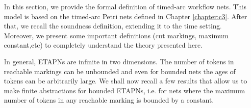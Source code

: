 %
%
%



In this section, we provide the formal definition of timed-arc workflow nets. This model is based on the 
timed-arc Petri nets defined in Chapter \ref{chapter:c3}. After that, we recall the soundness definition, extending it
to the time setting. Moreover, we present some important definitions (cut markings, maximum constant,etc) 
to completely understand the theory presented here.

In general, ETAPNs are infinite in two dimensions. The number of tokens
in reachable markings can be unbounded and even for bounded nets
the ages of tokens can be arbitrarily large. We shall now recall a 
few results that allow us to make finite abstractions for bounded
ETAPNs, i.e. for nets where the maximum number of tokens in any
reachable marking is bounded by a constant.

